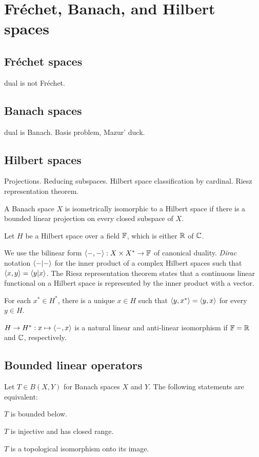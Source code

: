 \documentclass{../note}
\begin{document}
\chapter{Fr\'echet, Banach, and Hilbert spaces}

\section{Fr\'echet spaces}
dual is not Fr\'echet.

\section{Banach spaces}
dual is Banach.
Basis problem, Mazur' duck.

\section{Hilbert spaces}
Projections. Reducing subspaces.
Hilbert space classification by cardinal.
Riesz representation theorem.
\begin{prb}
\begin{parts}
\item A Banach space $X$ is isometrically isomorphic to a Hilbert space if there is a bounded linear projection on every closed subspace of $X$.
\end{parts}
\end{prb}

\begin{prb}
Let $H$ be a Hilbert space over a field $\mathbb{F}$, which is either $\mathbb{R}$ of $\mathbb{C}$.


We use the bilinear form $\langle-,-\rangle:X\times X^*\to\mathbb{F}$ of canonical duality.
\emph{Dirac} notation $\langle-|-\rangle$ for the inner product of a complex Hilbert spaces such that $\langle x,y\rangle=\langle y|x\rangle$.
The Riesz representation theorem states that a continuous linear functional on a Hilbert space is represented by the inner product with a vector.
\begin{parts}
\item For each $x^*\in H^*$, there is a unique $x\in H$ such that $\langle y,x^*\rangle=\langle y,x\rangle$ for every $y\in H$.
\item $H\to H^*:x\mapsto\langle-,x\rangle$ is a natural linear and anti-linear isomorphism if $\mathbb{F}=\mathbb{R}$ and $\mathbb{C}$, respectively.
\end{parts}
\end{prb}



\section{Bounded linear operators}
\begin{prb}
Let $T\in B(X,Y)$ for Banach spaces $X$ and $Y$.
The following statements are equivalent:
\begin{parts}
\item $T$ is bounded below.
\item $T$ is injective and has closed range.
\item $T$ is a topological isomorphism onto its image.
\end{parts}
\end{prb}
\end{document}
